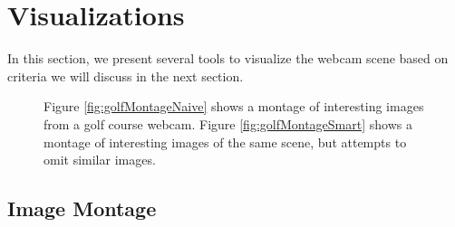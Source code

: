 \section{Visualizations}

In this section, we present several tools to visualize the webcam scene based on criteria we will discuss in the next section.

\begin{figure}
	\centering
		\caption[Image montage techniques.]{Figure \ref{fig:golfMontageNaive} shows a montage of interesting images from a golf course webcam. Figure \ref{fig:golfMontageSmart} shows a montage of interesting images of the same scene, but attempts to omit similar images.}
\end{figure}

\subsection{Image Montage}

